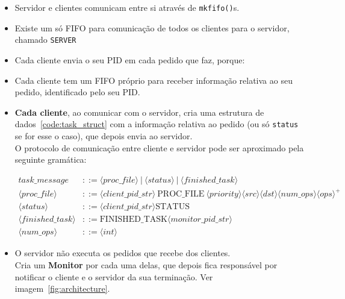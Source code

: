 \documentclass[11pt,a4paper]{report}%
\begin{document}
\begin{itemize}
  \item Servidor e clientes comunicam entre si através de \texttt{mkfifo()}s.
  \item Existe um só FIFO para comunicação de todos os clientes para o servidor, chamado
  \texttt{SERVER}
  \item Cada cliente envia o seu PID em cada pedido que faz, porque:
  \item Cada cliente tem um FIFO próprio para receber informação relativa ao seu pedido, identificado
  pelo seu PID.

  \item \textbf{Cada cliente}, ao comunicar com o servidor, cria uma estrutura de dados~\ref{code:task_struct}
  com a informação relativa ao pedido (ou só \texttt{status} se for esse o caso), que depois envia ao servidor.\\
  O protocolo de comunicação entre cliente e servidor pode ser aproximado pela seguinte gramática:

\begin{align*}
  task\_message &::= \langle proc\_file \rangle\ |\ \langle status \rangle\ |\ \langle finished\_task \rangle \\
  \langle proc\_file \rangle &::= \langle client\_pid\_str \rangle \ \text{PROC\_FILE} \ \langle priority \rangle \langle src \rangle \langle dst \rangle \langle num\_ops \rangle \langle ops \rangle^+\\
  \langle status \rangle    &::= \langle client\_pid\_str \rangle \text{STATUS} \\
  \langle finished\_task \rangle &::= \text{FINISHED\_TASK} \langle monitor\_pid\_str \rangle \\
  \langle num\_ops \rangle &::= \langle int \rangle
\end{align*}
\label{text:protocol}

  \item O servidor não executa os pedidos que recebe dos clientes.\\
  Cria um \textbf{Monitor} por cada uma delas, que depois fica responsável por notificar o
  cliente e o servidor da sua terminação\label{text:monitor}. Ver imagem~\ref{fig:architecture}.

\end{itemize}


\newpage
\end{document}
